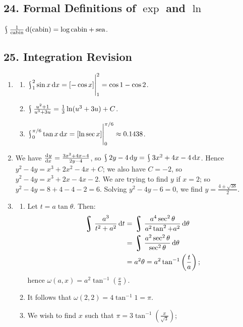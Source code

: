 \subsection*{24. Formal Definitions of $ \exp $ and $ \ln $}
$ \rint \frac{1}{\text{cabin}} \dif{(\text{cabin})} = \log \text{cabin} + \text{sea} $.

\subsection*{25. Integration Revision}
\begin{enumerate}
  \item
    \begin{enumerate}
      \item $ \rint^2_1 \sin x \dif{x} = \eval{[-\cos x]}_1^2 = \cos 1 - \cos 2 $.
      \item $ \rint \frac{u^2 + 1}{u^3 + 3u} = \frac{1}{3} \ln (u^3 + 3u) + C $.
      \item $ \rint^{\pi/6}_0 \tan x \dif{x} = \eval{[\ln \sec x]}_0^{\pi/6} \approx 0.1438 $.
    \end{enumerate}
  \item We have $ \od{y}{x} = \frac{3x^2 + 4x - 4}{2y - 4} $, so $ \rint 2y - 4 \dif{y} = \rint 3x^2 + 4x - 4 \dif{x} $.
        Hence $ y^2 - 4y = x^3 + 2x^2 - 4x + C $; we also have $ C = -2 $, so $ y^2 - 4y = x^3 + 2x - 4x - 2 $. We are
        trying to find $ y $ if $ x = 2 $; so $ y^2 - 4y = 8 + 4 - 4 - 2 = 6 $. Solving $ y^2 - 4y - 6 = 0 $, we find
        $ y = \frac{4 \pm \sqrt{38}}{2} $.
  \item
    \begin{enumerate}
      \item Let $ t = a \tan \theta $. Then:
            \begin{align*}
              \rint \frac{a^3}{t^2 + a^2} \dif{t} &= \rint \frac{a^4 \sec^2 \theta}{a^2 \tan^2 + a^2} \dif{\theta}\\
                                                  &= \rint \frac{a^2 \sec^2 \theta}{\sec^2 \theta} \dif{\theta}\\
                                                  &= a^2 \theta = a^2 \tan^{-1} \left(\frac{t}{a}\right);
            \end{align*}
            hence $ \omega(a,x) = a^2 \tan^{-1} \left(\frac{x}{a}\right) $.
      \item It follows that $ \omega(2,2) = 4\tan^{-1} 1 = \pi $.
      \item We wish to find $ x $ such that $ \pi = 3 \tan^{-1} \left(\frac{x}{\sqrt{3}}\right) $;

\end{enumerate}
\end{enumerate}
